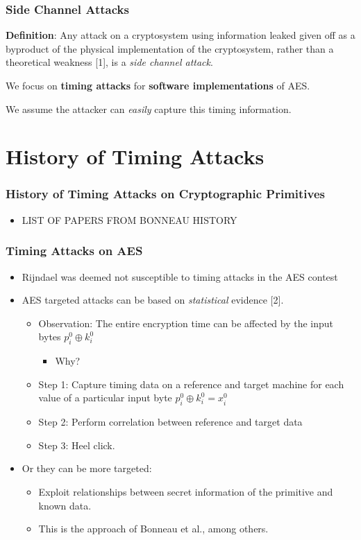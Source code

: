 \documentclass[9pt,handout]{beamer}
\begin{document}
\begin{frame}
	\frametitle{Side Channel Attacks}
	\textbf{Definition}: Any attack on a cryptosystem using information leaked given off as a byproduct of the physical implementation of the cryptosystem, rather than a theoretical weakness [1], is a \emph{side channel attack}.

	\bigskip

	We focus on \textbf{timing attacks} for \textbf{software implementations} of AES.

	\bigskip

	We assume the attacker can \emph{easily} capture this timing information.
\end{frame}

\section{History of Timing Attacks}
\begin{frame}
	\frametitle{History of Timing Attacks on Cryptographic Primitives}
	\begin{itemize}
		\item LIST OF PAPERS FROM BONNEAU HISTORY
	\end{itemize}
\end{frame}

\begin{frame}
	\frametitle{Timing Attacks on AES}
	\begin{itemize}
		\item Rijndael was deemed not susceptible to timing attacks in the AES contest
		\item AES targeted attacks can be based on \emph{statistical} evidence [2].
		\begin{itemize}
			\item Observation: The entire encryption time can be affected by the input bytes $p_i^0 \oplus k_i^0$
			\begin{itemize}
				\item Why? %
			\end{itemize}
			\item Step 1: Capture timing data on a reference and target machine for each value of a particular input byte $p_i^0 \oplus k_i^0 = x_i^0$
			\item Step 2: Perform correlation between reference and target data
			\item Step 3: Heel click.
		\end{itemize}
		\item Or they can be more targeted:
		\begin{itemize}
			\item Exploit relationships between secret information of the primitive and known data.
			\item This is the approach of Bonneau et al., among others.
		\end{itemize}
	\end{itemize}
\end{frame}
\end{document}
